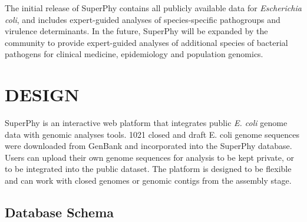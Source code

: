\documentclass[a4paper,twoside]{article}
\begin{document}
The initial release of SuperPhy contains all publicly available data for \textit{Escherichia coli}, and includes expert-guided analyses of species-specific pathogroups and virulence determinants. In the future, SuperPhy will be expanded by the community to provide expert-guided analyses of additional species of bacterial pathogens for clinical medicine, epidemiology and population genomics.

\section{\uppercase{Design}}
\label{sec:design}

\noindent SuperPhy is an interactive web platform that integrates public \textit{E. coli} genome data with genomic analyses tools. 1021 closed and draft E. coli genome sequences were downloaded from GenBank and incorporated into the SuperPhy database. Users can upload their own genome sequences for analysis to be kept private, or to be integrated into the public dataset. The platform is designed to be flexible and can work with closed genomes or genomic contigs from the assembly stage. 

\subsection{Database Schema}
\end{document}
